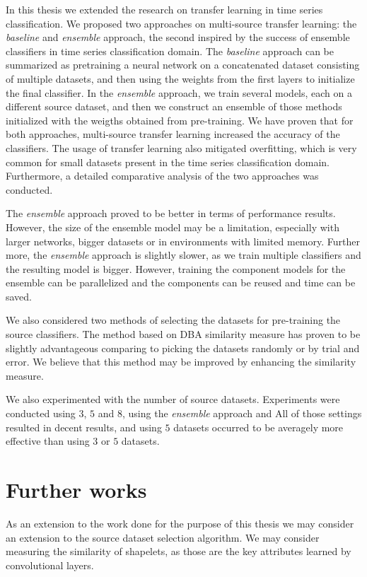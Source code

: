 \documentclass[a4paper,11pt,twoside]{report}
\theoremstyle{definition}
\begin{document}
In this thesis we extended the research on transfer learning in time series classification. We proposed two approaches on multi-source transfer learning: the \textit{baseline} and \textit{ensemble} approach, the second inspired by the success of ensemble classifiers in time series classification domain. The \textit{baseline} approach can be summarized as pretraining a neural network on a concatenated dataset consisting of multiple datasets, and then using the  weights from the first layers to initialize the final classifier. In the \textit{ensemble} approach, we train several models, each on a different source dataset, and then we construct an ensemble of those methods initialized with the weigths obtained from pre-training. We have proven that for both approaches, multi-source transfer learning increased the accuracy of the classifiers. The usage of transfer learning also mitigated overfitting, which is very common for small datasets present in the time series classification domain. Furthermore, a detailed comparative analysis of the two approaches was conducted.

The \textit{ensemble} approach proved to be better in terms of performance results. However, the size of the ensemble model may be a limitation, especially with larger networks, bigger datasets or in environments with limited memory. Further more, the \textit{ensemble} approach is slightly slower, as we train multiple classifiers and the resulting model is bigger. However, training the component models for the ensemble can be parallelized and the components can be reused and time can be saved.


We also considered two methods of selecting the datasets for pre-training the source classifiers. The method based on DBA similarity measure has proven to be slightly advantageous comparing to picking the datasets randomly or by trial and error. We believe that this method may be improved by enhancing the similarity measure.

We also  experimented with the number of source datasets. Experiments were conducted using $3$, $5$ and $8$, using the \textit{ensemble} approach and  All of those settings resulted in decent results, and using $5$ datasets occurred to be averagely more effective than using $3$ or $5$ datasets.

\section{Further works}
As an extension to the work done for the purpose of this thesis we may consider an extension to the source dataset selection algorithm. We may consider measuring the similarity of shapelets, as those are the key attributes learned by convolutional layers.
\end{document}
